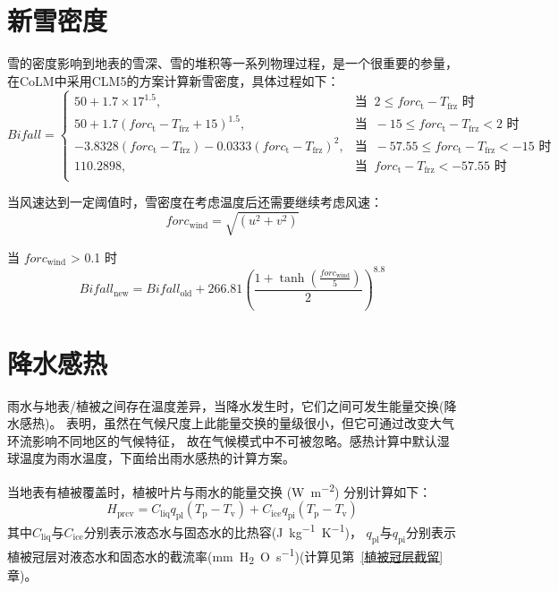\section{新雪密度}
雪的密度影响到地表的雪深、雪的堆积等一系列物理过程，是一个很重要的参量，在CoLM中采用CLM5的方案计算新雪密度，具体过程如下：
\begin{equation*}
  Bifall= \begin{cases}
    50 + 1.7\times 17^{1.5}, & \text{当 }\ 2\leqslant forc_{\mathrm {t}} - T_{\mathrm{frz}} \text{ 时}\\
    50 + 1.7(forc_{\mathrm {t}} - T_{\mathrm{frz}}+15)^{1.5}, & \text{当 }\ -15\leqslant forc_{\mathrm {t}} - T_{\mathrm{frz}} < 2 \text{ 时} \\
    -3.8328(forc_{\mathrm {t}} - T_{\mathrm{frz}}) - 0.0333(forc_{\mathrm {t}} - T_{\mathrm{frz}})^2, & \text{当 }\ -57.55\leqslant forc_{\mathrm {t}} - T_{\mathrm{frz}} < -15 \text{ 时} \\
    110.2898, & \text{当 }\ forc_{\mathrm {t}} - T_{\mathrm{frz}} < -57.55 \text{ 时}\\
  \end{cases}
\end{equation*}

当风速达到一定阈值时，雪密度在考虑温度后还需要继续考虑风速：
\begin{equation}
  forc_{\mathrm{wind}} = \sqrt{(u^2 + v^2)}
\end{equation}

当 $forc_{\mathrm{wind}}$ > 0.1 时
\begin{equation}
  Bifall_{\mathrm{new}} = Bifall_{\mathrm{old}} + 266.81{\left(\frac{1 + \tanh (\frac{forc_{\mathrm{wind}}}{5})}{2}\right)}^{8.8}
\end{equation}


\section{降水感热}\label{植被地表的雨水感热}
雨水与地表/植被之间存在温度差异，当降水发生时，它们之间可发生能量交换(降水感热)。
\citet{wei2014impact} 表明，虽然在气候尺度上此能量交换的量级很小，但它可通过改变大气环流影响不同地区的气候特征，
故在气候模式中不可被忽略。感热计算中默认湿球温度为雨水温度，下面给出雨水感热的计算方案。

当地表有植被覆盖时，植被叶片与雨水的能量交换 (\unit{W.m^{-2}}) 分别计算如下：
\begin{equation}
  H_{\mathrm{prcv}}=C_{\mathrm{liq}} q_{\mathrm{pl}}\left(T_{\mathrm{p}}-T_{\mathrm{v}}\right)+C_{\mathrm{ice}} q_{\mathrm{pi}}\left(T_{\mathrm{p}}-T_{\mathrm{v}}\right)
\end{equation}
其中$C_{\mathrm{liq}}$与$C_{\mathrm{ice}}$分别表示液态水与固态水的比热容(\unit{J.kg^{-1}.K^{-1}})，
$q_{\mathrm{pl}}$与$q_{\mathrm{pi}}$分别表示植被冠层对液态水和固态水的截流率(\unit{mm.H_2O.s^{-1}})(计算见第~\ref{植被冠层截留} 章)。


